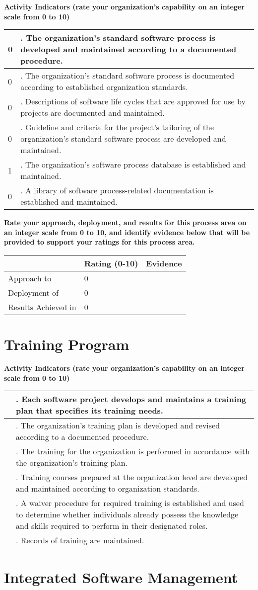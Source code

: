 \documentclass{article}
\newcommand{\KPAname}{}
\newenvironment{KPARate}[1]
	{\renewcommand{\KPAname}{#1}
	 {\bf Rate your approach, deployment, and results for
	  this process area on an integer scale from 0 to 10, and 
	  identify evidence below that will be provided to support your
	  ratings for this process area.}
	 \begin{center}
	 \begin{tabular}{|p{1.0in}|p{0.5in}|p{5.0in}|} \hline
	 & Rating (0-10) & \multicolumn{1}{c|}{Evidence} \\ \hline}
	{\end{tabular}
	 \end{center}}
\newcommand{\Approach}[2]{Approach to \KPAname & #1 & #2 \\ \hline}
\newcommand{\Deployment}[2]{Deployment of \KPAname & #1 & #2 \\ \hline}
\newcommand{\Results}[2]{Results Achieved in \KPAname & #1 & #2 \\
	\hline}
\newcounter{activity}
\newenvironment{KPAActivity}
	{
	 \setcounter{activity}{0}
	 {\bf Activity Indicators (rate your organization's capability
	 on an integer scale from 0 to 10)}
	 \begin{center}
	 \begin{tabular}{|p{0.5in}|p{6.0in}|} \hline
	}
	{
	 \end{tabular}
	 \end{center}
	}
\newcommand{\Activity}[2]{\stepcounter{activity} #1 &
\arabic{activity}. #2 \\ \hline}
\begin{document}
\begin{KPAActivity}
\Activity{0}{The organization's standard software process is
developed and maintained according to a documented procedure.}
\Activity{0}{The organization's standard software process is
documented according to established organization standards.}
\Activity{0}{Descriptions of software life cycles that are approved
for use by projects are documented and maintained.}
\Activity{0}{Guideline and criteria for the project's tailoring of
the organization's standard software process are developed and
maintained.}
\Activity{1}{The organization's software process database is
established and maintained.}
\Activity{0}{A library of software process-related documentation is
established and maintained.}
\end{KPAActivity}

\begin{KPARate}{Organization Process Definition}
\Approach{0}{}
\Deployment{0}{}
\Results{0}{}
\end{KPARate}

\newpage
\section{Training Program}

\begin{KPAActivity}
\Activity{}{Each software project develops and maintains a training
plan that specifies its training needs.}
\Activity{}{The organization's training plan is developed and
revised according to a documented procedure.}
\Activity{}{The training for the organization is performed in
accordance with the organization's training plan.}
\Activity{}{Training courses prepared at the organization level are
developed and maintained according to organization standards.}
\Activity{}{A waiver procedure for required training is established
and used to determine whether individuals already possess the
knowledge and skills required to perform in their designated roles.}
\Activity{}{Records of training are maintained.}
\end{KPAActivity}

\newpage
\section{Integrated Software Management}
\end{document}
